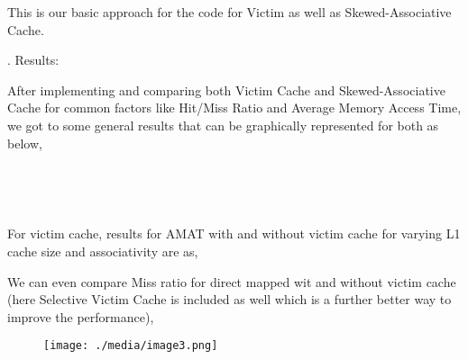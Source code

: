 \documentclass[12pt]{article}
\begin{document}
{\fontsize{16pt}{19.2pt}\selectfont This is our basic approach for the code for Victim as well as Skewed-Associative Cache.\par}\par


\vspace{\baselineskip}
{\fontsize{22pt}{26.4pt}. Results:\par}\par

{\fontsize{16pt}{19.2pt}\selectfont After implementing and comparing both Victim Cache and Skewed-Associative Cache for common factors like Hit/Miss Ratio and Average Memory Access Time, we got to some general results that can be graphically represented for both as below,\par}\par





\begin{figure}[H]	\begin{subfigure}		\texttt{[image: ./media/image1.png]}
	\end{subfigure}
~	\begin{subfigure}		\texttt{[image: ./media/image2.png]}
	\end{subfigure}
~
\end{figure}



{\fontsize{16pt}{19.2pt}\selectfont For victim cache, results for AMAT with and without victim cache for varying L1 cache size and associativity are as,\par}\par


\vspace{\baselineskip}
{\fontsize{16pt}{19.2pt}\selectfont We can even compare Miss ratio for direct mapped wit and without victim cache (here Selective Victim Cache is included as well which is a further better way to improve the performance),\par}\par




\begin{figure}[H]
	\begin{Center}
		\texttt{[image: ./media/image3.png]}
	\end{Center}
\end{figure}
\end{document}
